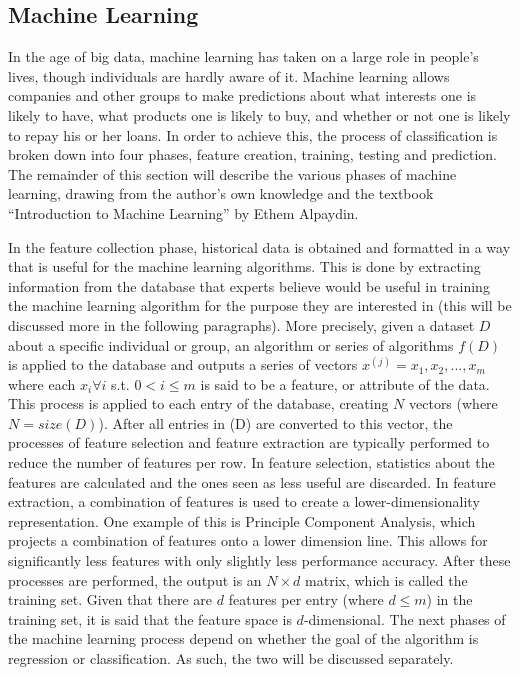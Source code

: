 \documentclass[12pt]{article} %
\begin{document}
\subsection{Machine Learning} \label{subsec:machinelearning}%
In the age of big data, machine learning has taken on a large role in people's lives, though individuals are hardly aware of it. Machine learning allows companies and other groups to make predictions about what interests one is likely to have, what products one is likely to buy, and whether or not one is likely to repay his or her loans. In order to achieve this, the process of classification is broken down into four phases, feature creation, training, testing and prediction. The remainder of this section will describe the various phases of machine learning, drawing from the author's own knowledge and the textbook ``Introduction to Machine Learning'' by Ethem Alpaydin. \cite{introduction}

In the feature collection phase, historical data is obtained and formatted in a way that is useful for the machine learning algorithms. This is done by extracting information from the database that experts believe would be useful in training the machine learning algorithm for the purpose they are interested in (this will be discussed more in the following paragraphs). More precisely, given a dataset $D$ about a specific individual or group, an algorithm or series of algorithms $f(D)$ is applied to the database and outputs a series of vectors $x^{(j)} = {x_1, x_2, ..., x_m}$ where each $x_i \forall i$ s.t. $0 < i \leq m$ is said to be a feature, or attribute of the data. This process is applied to each entry of the database, creating $N$ vectors (where $N = size(D)$). After all entries in (D) are converted to this vector, the processes of feature selection and feature extraction are typically performed to reduce the number of features per row. In feature selection, statistics about the features are calculated and the ones seen as less useful are discarded. In feature extraction, a combination of features is used to create a lower-dimensionality representation. One example of this is Principle Component Analysis, which projects a combination of features onto a lower dimension line. This allows for significantly less features with only slightly less performance accuracy. After these processes are performed, the output is an $N \times d$ matrix, which is called the training set. Given that there are $d$ features per entry (where $d \leq m$) in the training set, it is said that the feature space is $d$-dimensional. The next phases of the machine learning process depend on whether the goal of the algorithm is regression or classification. As such, the two will be discussed separately.
\end{document}

